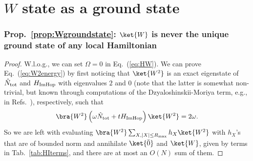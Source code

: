 \documentclass[prx,letterpaper,aps,superscriptaddress,floatfix,twocolumn,nofootinbib]{revtex4-2}
\theoremstyle{definition}
\begin{document}
%
\section{$W$ state as a ground state}\label{app:nonuniqueGS}
\subsubsection{Prop.~\ref{prop:Wgroundstate}: $\ket{W}$ is never the unique ground state of any local Hamiltonian}
\begin{proof}
    W.l.o.g., we can set $\Omega = 0$ in Eq.~(\ref{eq:HW}).
    We can prove Eq.~(\ref{eq:W2energy}) by first noticing that $\ket{W^2}$ is an exact eigenstate of $\hat{N}_{\rm tot}$ and $H_{\rm ImHop}$ with eigenvalues $2$ and $0$ (note that the latter is somewhat non-trivial, but known through computations of the Dzyaloshinskii-Moriya term, e.g., in Refs.~\cite{Mark2020Eta, Moudgalya_2022, PRXQuantum.2.020330}), respectively, such that
    \begin{equation}
    \bra{W^2}\left(\omega\hat{N}_{\rm tot}+t H_{\rm ImHop}\right)\ket{W^2}=2\omega.
    \end{equation}
    So we are left with evaluating
    $\bra{W^2}\sum_{X, |X|\leq R_{\text{max}}} h_X\ket{W^2}$
    with $h_X$'s that are of bounded norm and annihilate $\ket{\bar{0}}$ and $\ket{W}$, given by terms in Tab.~\ref{tab:HIterms}, and there are at most an $O(N)$ sum of them.


\end{proof}
\end{document}
